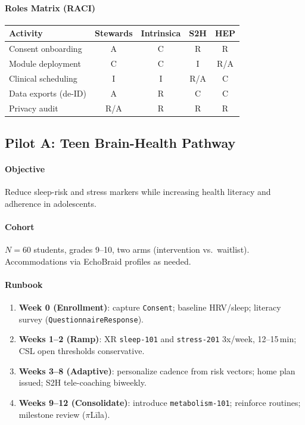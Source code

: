 \documentclass[11pt]{article}
\theoremstyle{plain}
\begin{document}
\paragraph{Roles Matrix (RACI)}
\begin{center}
\begin{tabular}{l c c c c}
\hline
Activity & Stewards & Intrinsica & S2H & HEP \\
\hline
Consent onboarding & A & C & R & R \\
Module deployment & C & C & I & R/A \\
Clinical scheduling & I & I & R/A & C \\
Data exports (de-ID) & A & R & C & C \\
Privacy audit & R/A & R & R & R \\
\hline
\end{tabular}
\end{center}

\subsection{Pilot A: Teen Brain-Health Pathway}\label{pilot:teen}
\paragraph{Objective}
Reduce sleep-risk and stress markers while increasing health literacy and adherence in adolescents.

\paragraph{Cohort}
$N=60$ students, grades 9--10, two arms (intervention vs.\ waitlist). Accommodations via EchoBraid profiles as needed.

\paragraph{Runbook}
\begin{enumerate}
  \item \textbf{Week 0 (Enrollment)}: capture \texttt{Consent}; baseline HRV/sleep; literacy survey (\texttt{QuestionnaireResponse}).
  \item \textbf{Weeks 1--2 (Ramp)}: XR \texttt{sleep-101} and \texttt{stress-201} 3x/week, 12--15\,min; CSL open thresholds conservative.
  \item \textbf{Weeks 3--8 (Adaptive)}: personalize cadence from risk vectors; home plan issued; S2H tele-coaching biweekly.
  \item \textbf{Weeks 9--12 (Consolidate)}: introduce \texttt{metabolism-101}; reinforce routines; milestone review ($\pi$Līla).
\end{enumerate}
\end{document}
